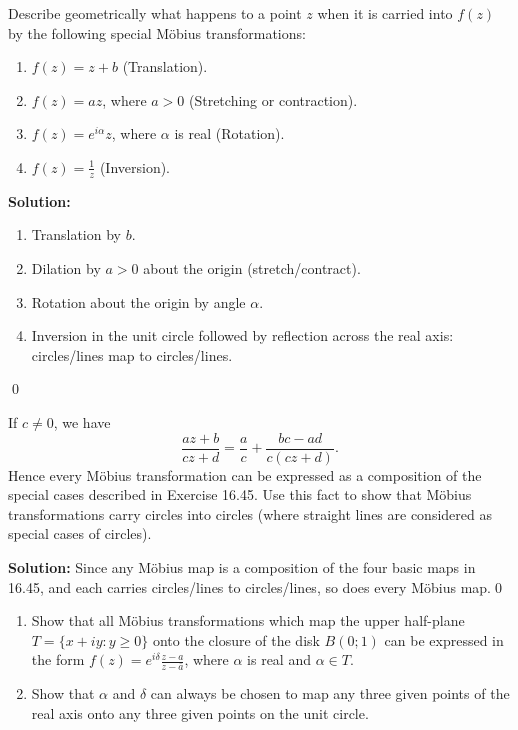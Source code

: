 \begin{problembox}
Describe geometrically what happens to a point \( z \) when it is carried into \( f(z) \) by the following special Möbius transformations:
\begin{enumerate}[label=(\alph*)]
\item \( f(z) = z + b \) (Translation).
\item \( f(z) = a z \), where \( a > 0 \) (Stretching or contraction).
\item \( f(z) = e^{i \alpha} z \), where \( \alpha \) is real (Rotation).
\item \( f(z) = \frac{1}{z} \) (Inversion).
\end{enumerate}
\end{problembox}

\noindent\textbf{Solution:}
\begin{enumerate}[label=(\alph*)]
\item Translation by $b$.
\item Dilation by $a>0$ about the origin (stretch/contract).
\item Rotation about the origin by angle $\alpha$.
\item Inversion in the unit circle followed by reflection across the real axis: circles/lines map to circles/lines.
\end{enumerate}\qed


\begin{problembox}
If \( c \neq 0 \), we have
\[ \frac{a z + b}{c z + d} = \frac{a}{c} + \frac{b c - a d}{c (c z + d)}. \]
Hence every Möbius transformation can be expressed as a composition of the special cases described in Exercise 16.45. Use this fact to show that Möbius transformations carry circles into circles (where straight lines are considered as special cases of circles).
\end{problembox}

\noindent\textbf{Solution:}
Since any Möbius map is a composition of the four basic maps in 16.45, and each carries circles/lines to circles/lines, so does every Möbius map.\qed


\begin{problembox}
\begin{enumerate}[label=(\alph*)]
\item Show that all Möbius transformations which map the upper half-plane \( T = \{ x + i y : y \geq 0 \} \) onto the closure of the disk \( B(0; 1) \) can be expressed in the form \( f(z) = e^{i \delta} \frac{z - a}{z - \bar{a}} \), where \( \alpha \) is real and \( \alpha \in T \).
\item Show that \( \alpha \) and \( \delta \) can always be chosen to map any three given points of the real axis onto any three given points on the unit circle.
\end{enumerate}
\end{problembox}

